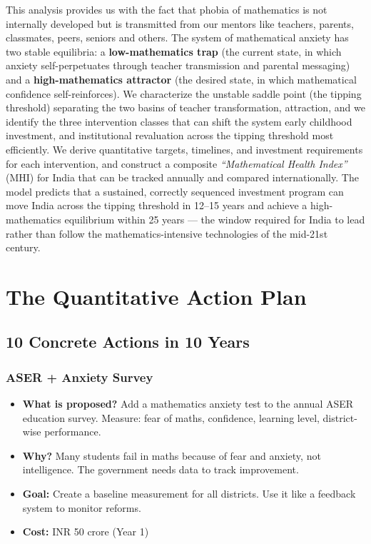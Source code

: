 \documentclass[12pt,a4paper]{article}
\begin{document}
This analysis provides us with the fact that phobia of mathematics is not internally developed but is transmitted from our mentors like teachers, parents, classmates, peers, seniors and others. The system of mathematical anxiety has two stable equilibria: a \textbf{low-mathematics trap} (the current state, in which anxiety self-perpetuates through teacher transmission and parental messaging) and a \textbf{high-mathematics attractor} (the desired state, in which mathematical confidence self-reinforces). We characterize the unstable saddle point (the tipping threshold) separating the two basins of teacher transformation, attraction, and we identify the three intervention classes that can shift the system early childhood investment, and institutional revaluation across the tipping threshold most efficiently. We derive quantitative targets, timelines, and investment requirements for each intervention, and construct a composite \textit{“Mathematical Health Index”} (MHI) for India that can be tracked annually and compared internationally. The model predicts that a sustained, correctly sequenced investment program can move India across the tipping threshold in 12--15 years and achieve a high-mathematics equilibrium within 25 years — the window required for India to lead rather than follow the mathematics-intensive technologies of the mid-21st century.

\newpage

\section{The Quantitative Action Plan}

\subsection{10 Concrete Actions in 10 Years}

\subsubsection{ASER + Anxiety Survey}
\begin{itemize}[leftmargin=*]
    \item \textbf{What is proposed?} Add a mathematics anxiety test to the annual ASER education survey. Measure: fear of maths, confidence, learning level, district-wise performance.
    \item \textbf{Why?} Many students fail in maths because of fear and anxiety, not intelligence. The government needs data to track improvement.
    \item \textbf{Goal:} Create a baseline measurement for all districts. Use it like a feedback system to monitor reforms.
    \item \textbf{Cost:} INR 50 crore (Year 1)
\end{itemize}
\end{document}
